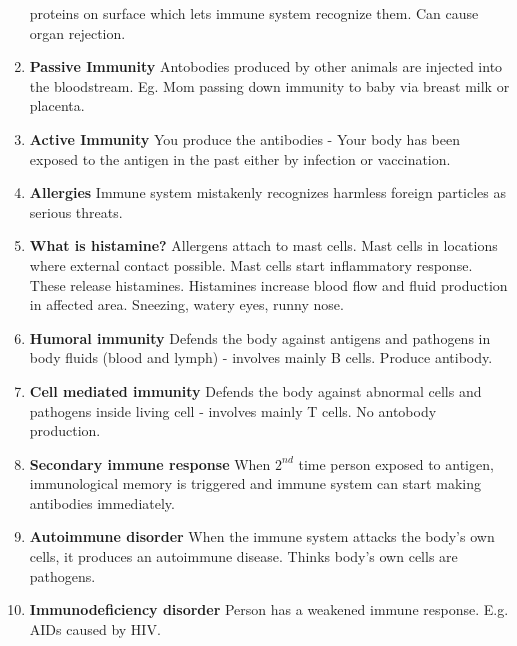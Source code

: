 \documentclass[9pt]{article}
\begin{document}
\begin{enumerate}
    proteins on surface which lets immune system recognize them. Can
    cause organ rejection.
  \item {\bf Passive Immunity} Antobodies produced by other animals
    are injected into the bloodstream. Eg. Mom passing down immunity
    to baby via breast milk or placenta.
  \item {\bf Active Immunity} You produce the antibodies - Your body
    has been exposed to the antigen in the past either by infection or
    vaccination.
  \item {\bf Allergies} Immune system mistakenly recognizes harmless
    foreign particles as serious threats.
  \item {\bf What is histamine?}  Allergens attach to mast cells. Mast
    cells in locations where external contact possible. Mast cells
    start inflammatory response. These release histamines. Histamines
    increase blood flow and fluid production in affected
    area. Sneezing, watery eyes, runny nose.
  \item {\bf Humoral immunity} Defends the body against antigens and
    pathogens in body fluids (blood and lymph) - involves mainly B
    cells. Produce antibody.
  \item {\bf Cell mediated immunity} Defends the body against abnormal
    cells and pathogens inside living cell - involves mainly T
    cells. No antobody production.
  \item {\bf Secondary immune response} When $2^{nd}$ time person
    exposed to antigen, immunological memory is triggered and immune
    system can start making antibodies immediately.
  \item {\bf Autoimmune disorder} When the immune system attacks the
    body's own cells, it produces an autoimmune disease. Thinks body's
    own cells are pathogens.
  \item {\bf Immunodeficiency disorder} Person has a weakened immune
    response. E.g. AIDs caused by HIV.
\end{enumerate}
\end{document}
